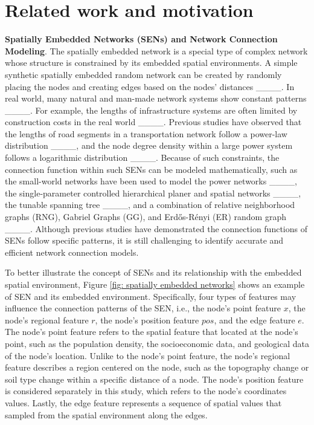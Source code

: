 \section{Related work and motivation}
\textbf{Spatially Embedded Networks (SENs) and Network Connection Modeling}. The
spatially embedded network is a special type of complex network whose structure
is constrained by its embedded spatial environments. A simple synthetic
spatially embedded random network can be created by randomly placing the nodes
and creating edges based on the nodes' distances ____. In
real world, many natural and man-made network systems show constant patterns
____. For example, the lengths of infrastructure
systems are often limited by construction costs in the real world
____. Previous studies have observed that the lengths of
road segments in a transportation network follow a power-law distribution
____, and the node degree density within a large power
system follows a logarithmic distribution ____. Because
of such constraints, the connection function within such SENs can be modeled
mathematically, such as the small-world networks have been used to model the
power networks ____, the single-parameter controlled
hierarchical planer and spatial networks ____, the tunable
spanning tree ____, and a combination of relative
neighborhood graphs (RNG), Gabriel Graphs (GG), and Erd\H{o}s-R\'enyi (ER)
random graph ____.  Although previous studies have
demonstrated the connection functions of SENs follow specific patterns, it is
still challenging to identify accurate and efficient network connection models.

To better illustrate the concept of SENs and its relationship with the embedded
spatial environment, Figure \ref*{fig: spatially embedded networks} shows an
example of SEN and its embedded environment. Specifically, four types of
features may influence the connection patterns of the SEN, i.e., the node's
point feature $x$, the node's regional feature $r$, the node's position feature
$pos$, and the edge feature $e$. The node's point feature refers to the spatial
feature that located at the node's point, such as the population density, the
socioeconomic data, and geological data of the node's location. Unlike to the
node's point feature, the node's regional feature describes a region centered on
the node, such as the topography change or soil type change within a specific
distance of a node. The node's position feature is considered separately in this
study, which refers to the node's coordinates values. Lastly, the edge feature
represents a sequence of spatial values that sampled from the spatial
environment along the edges.

